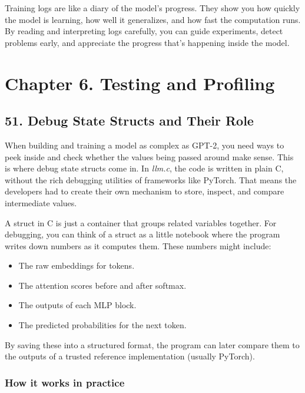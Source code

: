 \documentclass[
  letterpaper,
  DIV=11,
  numbers=noendperiod]{scrreprt}
\providecommand{\tightlist}{%
  \setlength{\itemsep}{0pt}\setlength{\parskip}{0pt}}
\begin{document}
Training logs are like a diary of the model's progress. They show you
how quickly the model is learning, how well it generalizes, and how fast
the computation runs. By reading and interpreting logs carefully, you
can guide experiments, detect problems early, and appreciate the
progress that's happening inside the model.

\section{Chapter 6. Testing and
Profiling}\label{chapter-6.-testing-and-profiling}

\subsection{51. Debug State Structs and Their
Role}\label{debug-state-structs-and-their-role}

When building and training a model as complex as GPT-2, you need ways to
peek inside and check whether the values being passed around make sense.
This is where debug state structs come in. In \emph{llm.c}, the code is
written in plain C, without the rich debugging utilities of frameworks
like PyTorch. That means the developers had to create their own
mechanism to store, inspect, and compare intermediate values.

A struct in C is just a container that groups related variables
together. For debugging, you can think of a struct as a little notebook
where the program writes down numbers as it computes them. These numbers
might include:

\begin{itemize}
\tightlist
\item
  The raw embeddings for tokens.
\item
  The attention scores before and after softmax.
\item
  The outputs of each MLP block.
\item
  The predicted probabilities for the next token.
\end{itemize}

By saving these into a structured format, the program can later compare
them to the outputs of a trusted reference implementation (usually
PyTorch).

\subsubsection{How it works in
practice}\label{how-it-works-in-practice-1}
\end{document}
